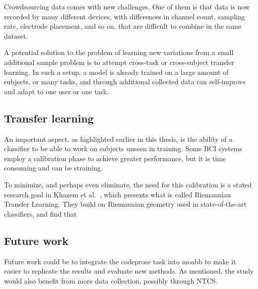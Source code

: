     Crowdsourcing data comes with new challenges. One of them is that data is now recorded by many different devices, with differences in channel count, sampling rate, electrode placement, and so on, that are difficult to combine in the same dataset. 

    A potential solution to the problem of learning new variations from a small additional sample problem is to attempt cross-task or cross-subject transfer learning. In such a setup, a model is already trained on a large amount of subjects, or many tasks, and through additional collected data can self-improve and adapt to one user or one task.



\subsection{Transfer learning}

An important aspect, as highlighted earlier in this thesis, is the ability of a classifier to be able to work on subjects unseen in training. Some BCI systems employ a calibration phase to achieve greater performance, but it is time consuming and can be straining. 

To minimize, and perhaps even eliminate, the need for this calibration is a stated research goal in Khazem et al.~\cite{khazem_minimizing_2021}, which presents what is called Riemannian Transfer Learning. They build on Riemannian geometry used in state-of-the-art classifiers, and find that

\subsection{Future work}

Future work could be to integrate the codeprose task into moabb to make it easier to replicate the results and evaluate new methods. As mentioned, the study would also benefit from more data collection, possibly through NTCS\@.
